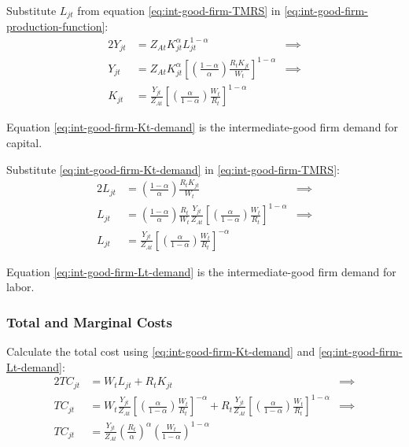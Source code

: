 \documentclass[
thesis.tex
]{subfiles}
\begin{document}
	Substitute $L_{jt}$ from equation \ref{eq:int-good-firm-TMRS} in \ref{eq:int-good-firm-production-function}:
	\begin{alignat}{2}
		Y_{jt} & = Z_{At} K_{jt}^\alpha L_{jt}^{1-\alpha} &\implies \nonumber \\
		Y_{jt} & = Z_{At} K_{jt}^\alpha \left[ \left( \frac{1-\alpha}{\alpha} \right) \frac{R_t K_{jt}}{W_t} \right]^{1-\alpha} &\implies \nonumber \\
		K_{jt} & = \frac{Y_{jt}}{Z_{At}} \left[ \left( \frac{\alpha}{1-\alpha} \right) \frac{W_t}{R_t}\right]^{1-\alpha} \label{eq:int-good-firm-Kt-demand}
	\end{alignat}
	
	Equation \ref{eq:int-good-firm-Kt-demand} is the intermediate-good firm demand for capital. 
	
	Substitute \ref{eq:int-good-firm-Kt-demand} in \ref{eq:int-good-firm-TMRS}:
	\begin{alignat}{2}
		L_{jt} & = \left( \frac{1-\alpha}{\alpha} \right) \frac{R_t K_{jt}}{W_t} &\implies \nonumber \\
		L_{jt} & = \left( \frac{1-\alpha}{\alpha} \right) \frac{R_t}{W_t} \frac{Y_{jt}}{Z_{At}} \left[ \left( \frac{\alpha}{1-\alpha} \right) \frac{W_t}{R_t}\right]^{1-\alpha} &\implies \nonumber \\
		L_{jt} & = \frac{Y_{jt}}{Z_{At}} \left[ \left( \frac{\alpha}{1-\alpha} \right) \frac{W_t}{R_t}\right]^{-\alpha} \label{eq:int-good-firm-Lt-demand}
	\end{alignat}
	
	Equation \ref{eq:int-good-firm-Lt-demand} is the intermediate-good firm demand for labor.
	
	\subsubsection*{Total and Marginal Costs}
	
	Calculate the total cost using \ref{eq:int-good-firm-Kt-demand} and \ref{eq:int-good-firm-Lt-demand}:
	\begin{alignat}{2}
		TC_{jt} & = W_t L_{jt} + R_t K_{jt} &\implies \nonumber \\
		TC_{jt} & = W_t \frac{Y_{jt}}{Z_{At}} \left[ \left( \frac{\alpha}{1-\alpha} \right) \frac{W_t}{R_t} \right]^{-\alpha} + R_t \frac{Y_{jt}}{Z_{At}} \left[ \left( \frac{\alpha}{1-\alpha} \right) \frac{W_t}{R_t} \right]^{1-\alpha} &\implies \nonumber \\
		TC_{jt} & = \frac{Y_{jt}}{Z_{At}} \left( \frac{R_t}{\alpha} \right)^{\alpha} \left( \frac{W_t}{1-\alpha} \right)^{1-\alpha} \label{eq:int-good-firm-TC}
	\end{alignat}
	
\end{document}
